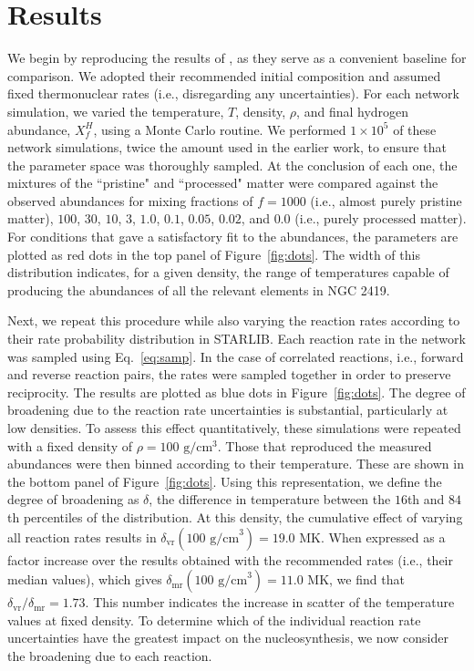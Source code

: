 \documentclass[twocolumn]{aastex6}
\begin{document}
\section{Results} \label{sec:methods}
We begin by reproducing the results of \citet{Iliadis_2016}, as they serve as a convenient baseline for comparison.
We adopted their recommended initial composition and assumed fixed thermonuclear rates (i.e., disregarding any uncertainties). For each network simulation, we varied the temperature, $T$, density, $\rho$, and final hydrogen abundance, $X^H_f$, using a Monte Carlo routine. We performed $1 \times 10^5$ of these network simulations, twice the amount used in the earlier work, to ensure that the parameter space was thoroughly sampled.
At the conclusion of each one, the mixtures of the ``pristine" and ``processed" matter were compared against the observed abundances for mixing fractions of $f=1000$ (i.e., almost purely pristine matter), $100$, $30$, $10$, $3$, $1.0$, $0.1$, $0.05$, $0.02$, and $0.0$ (i.e., purely processed matter). For conditions that gave a satisfactory fit to the abundances, the parameters are plotted as red dots in the top panel of Figure~\ref{fig:dots}. 
The width of this distribution indicates, for a given density, the range of temperatures capable of producing the abundances of all the relevant elements in NGC 2419.  
\par
Next, we repeat this procedure while also varying the reaction rates according to their rate probability distribution in STARLIB. Each reaction rate in the network was sampled using Eq.~\ref{eq:samp}. In the case of correlated reactions, i.e., forward and reverse reaction pairs, the rates were sampled together in order to preserve reciprocity.
The results are plotted as blue dots in Figure~\ref{fig:dots}. 
The degree of broadening due to the reaction rate uncertainties is substantial, particularly at low densities. To assess this effect quantitatively, these simulations were repeated with a fixed density of $\rho=100 \text{ g}/\text{cm}^3$. Those that reproduced the measured abundances were then binned according to their temperature. These are shown in the bottom panel of Figure~\ref{fig:dots}. Using this representation, we define the degree of broadening as $\delta$, the difference in temperature between the $16$th and $84$th percentiles of the distribution. At this density, the cumulative effect of varying all reaction rates results in $\delta_{\text{vr}}(100 \text{ g/cm}^3)=19.0$ MK. When expressed as a factor increase over the results obtained with the recommended rates (i.e., their median values), which gives $\delta_{\text{mr}}(100 \text{ g/cm}^3)=11.0$ MK, we find that $\delta_{\text{vr}}/\delta_{\text{mr}}=1.73$. This number indicates the increase in scatter of the temperature values at fixed density. To determine which of the individual reaction rate uncertainties have the greatest impact on the nucleosynthesis, we now consider the broadening due to each reaction. 
\end{document}
